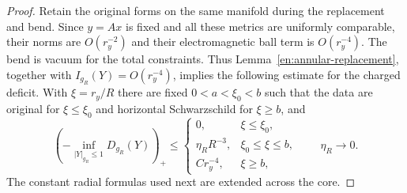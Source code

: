 \begin{proof}
Retain the original forms on the same manifold during the replacement
and bend. Since $y=Ax$ is fixed and all these metrics are uniformly
comparable, their norms are $O(r_y^{-2})$ and their electromagnetic
ball term is $O(r_y^{-4})$. The bend is vacuum for the total
constraints. Thus Lemma~\ref{en:annular-replacement}, together
with $I_{g_R}(Y)=O(r_y^{-4})$, implies the following estimate for
the charged deficit. With $\xi=r_y/R$ there are fixed
$0<a<\xi_0<b$ such that the data are original for $\xi\leq\xi_0$
and horizontal Schwarzschild for $\xi\geq b$, and
\begin{equation}\label{en:charged-deficit}
 \left(-\inf_{|Y|_{g_R}\leq1}D_{g_R}(Y)\right)_+
 \leq
 \begin{cases}
 0,&\xi\leq\xi_0,\\
 \eta_RR^{-3},&\xi_0\leq\xi\leq b,\\
 C r_y^{-4},&\xi\geq b,
 \end{cases}
 \qquad \eta_R\to0.
\end{equation}
The constant radial formulas used next are extended across the core.


\end{proof}
